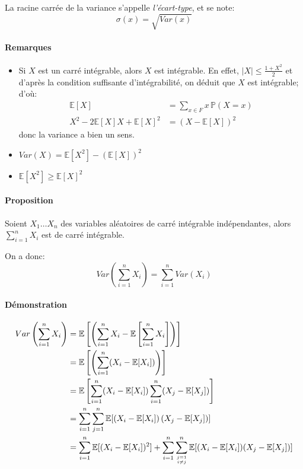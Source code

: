 \documentclass[a4paper,10pt,french,openany]{memoir}
\newcommand{\Proba}{\mathbb{P}}
\newcommand{\Esper}{\mathbb{E}}
\newcommand{\Var}{Var}
\newcommand{\abs}[1]{\lvert #1 \rvert}
\begin{document}
La racine carrée de la variance s'appelle \emph{l'écart-type}, et se note: \[\sigma(x)=\sqrt{\Var(x)}\]

\paragraph{Remarques}
\begin{itemize}
 \item Si $X$ est un carré intégrable, alors $X$ est intégrable. En effet, $\abs{X}\leq\frac{1+X^2}2$ et d'après la condition suffisante d'intégrabilité, on déduit que $X$ est intégrable; d'où:
 \begin{align*}
 \Esper[X] &= \sum_{x\in F} x\,\Proba(X=x) \\
 X^2-2 \Esper[X] X+\Esper[X]^2 &= (X-\Esper[X])^2
 \end{align*}
 donc la variance a bien un sens.
 \item $\Var(X)=\Esper[X^2]-(\Esper[X])^2$
 \item $\Esper[X^2]\geq\Esper[X]^2$
\end{itemize}

\paragraph{Proposition}
Soient $X_1\dots X_n$ des variables aléatoires de carré intégrable indépendantes, alors $\sum_{i=1}^n X_i$ est de carré intégrable.

On a donc:
\[\Var \left(\sum_{i=1}^n X_i\right) = \sum_{i=1}^n \Var(X_i)\]

\paragraph{Démonstration}
\begin{align*}
 \Var \left(\sum_{i=1}^n X_i\right) &= \Esper\left[\left(\sum_{i=1}^n X_i - \Esper\left[\sum_{i=1}^n X_i\right]\right)\right] \\
    &= \Esper\left[\left(\sum_{i=1}^n (X_i - \Esper[X_i])\right)\right] \\
    &= \Esper\left[\sum_{i=1}^n (X_i - \Esper[X_i]) \sum_{i=1}^n (X_j - \Esper[X_j])\right] \\
    &= \sum_{i=1}^n \sum_{j=1}^n \Esper[(X_i - \Esper[X_i])\,(X_j - \Esper[X_j])] \\
    &= \sum_{i=1}^n \Esper[(X_i - \Esper[X_i])^2] + \sum_{i=1}^n \sum_{\genfrac{}{}{0pt}{}{j=1}{i\neq j}}^n \Esper[(X_i - \Esper[X_i])(X_j - \Esper[X_j])]
\end{align*}
\end{document}

